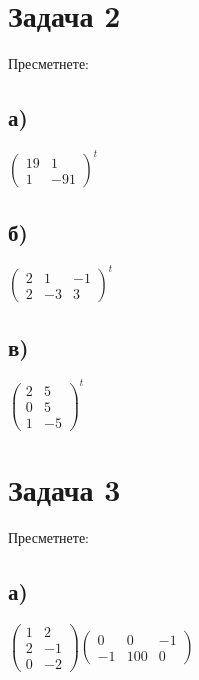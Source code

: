 \documentclass[12pt]{article}
\begin{document}
\section*{Задача 2}
    
Пресметнете:

\subsection*{а)}

$\begin{pmatrix}
    19 & 1 \\
    1 & -91
\end{pmatrix}^t$

\subsection*{б)}

$\begin{pmatrix}
    2 & 1 & -1 \\
    2 & -3 & 3
\end{pmatrix}^t$

\subsection*{в)}

$\begin{pmatrix}
    2 & 5 \\
    0 & 5 \\
    1 & -5
\end{pmatrix}^t$

\section*{Задача 3}

Пресметнете:

\subsection*{а)}

$\begin{pmatrix}
    1 & 2 \\
    2 & -1 \\
    0 & -2
\end{pmatrix} \begin{pmatrix}
    0 & 0 & -1 \\
    -1 & 100 & 0
\end{pmatrix}$
\end{document}
